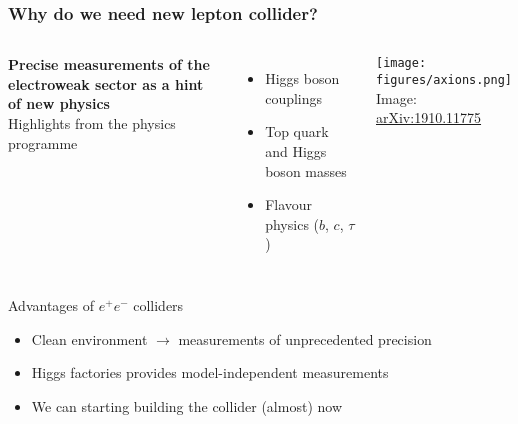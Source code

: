 \documentclass[aspectratio=169]{beamer}
\newcommand{\bluetext}[1]{%
  \textcolor{myBlue}{#1}
}
\begin{document}
\begin{frame}
  \frametitle{Why do we need new lepton collider?}
  
 \vspace{2ex}
 \begin{columns}[c]
  \bluetext{{\bf Precise measurements of the electroweak sector as a hint
  of new physics}} \\[2ex]

  \bluetext{Highlights from the physics programme}
  \begin{itemize}
    \item Higgs boson couplings
    \item Top quark and Higgs boson masses
    \item Flavour physics ($b$, $c$, $\tau$)
  \end{itemize}

    \texttt{[image: figures/axions.png]} \\
    \tiny{Image: \href{https://arxiv.org/abs/1910.11775}{arXiv:1910.11775}}
  \end{columns}
 \pause%
 
  \vspace{1ex}
  \bluetext{Advantages of $e^+e^-$ colliders}
  \begin{itemize}
    \item Clean environment $\rightarrow$ measurements of unprecedented precision\\
    \item Higgs factories provides model-independent measurements
    \item We can starting building the collider (almost) now
  \end{itemize}
\end{frame}
\end{document}
